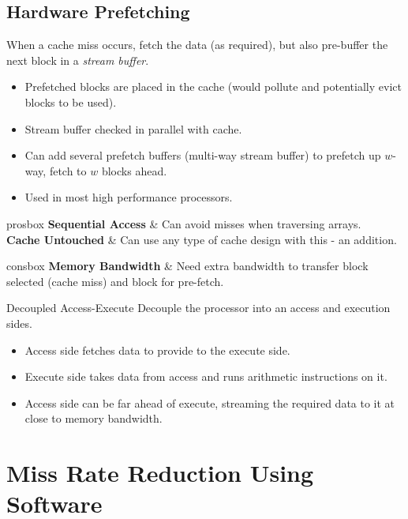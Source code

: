 \subsection{Hardware Prefetching}
When a cache miss occurs, fetch the data (as required), but also pre-buffer the next block in a \textit{stream buffer}.
\begin{itemize}
	\item Prefetched blocks are placed in the cache (would pollute and potentially evict blocks to be used).
	\item Stream buffer checked in parallel with cache.
	\item Can add several prefetch buffers (multi-way stream buffer) to prefetch up $w$-way, fetch to $w$ blocks ahead.
	\item Used in most high performance processors.
\end{itemize}

\begin{tabbox}{prosbox}
	\textbf{Sequential Access} & Can avoid misses when traversing arrays. \\
	\textbf{Cache Untouched} & Can use any type of cache design with this - an addition. \\
\end{tabbox}

\begin{tabbox}[.7\textwidth]{consbox}
	\textbf{Memory Bandwidth} & Need extra bandwidth to transfer block selected (cache miss) and block for pre-fetch. \\
\end{tabbox}

\begin{sidenotebox}{Decoupled Access-Execute}
	Decouple the processor into an access and execution sides.
	\begin{itemize}
		\item Access side fetches data to provide to the execute side.
		\item Execute side takes data from access and runs arithmetic instructions on it.
		\item Access side can be far ahead of execute, streaming the required data to it at close to memory bandwidth.
	\end{itemize}
\end{sidenotebox}

\section{Miss Rate Reduction Using Software}
